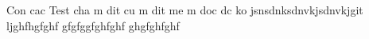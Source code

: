 Con cac
Test
cha m dit cu 
m dit me
m doc dc ko
jsnsdnksdnvkjsdnvkjgit 
ljghfhgfghf
gfgfggfghfghf
ghgfghfghf 
